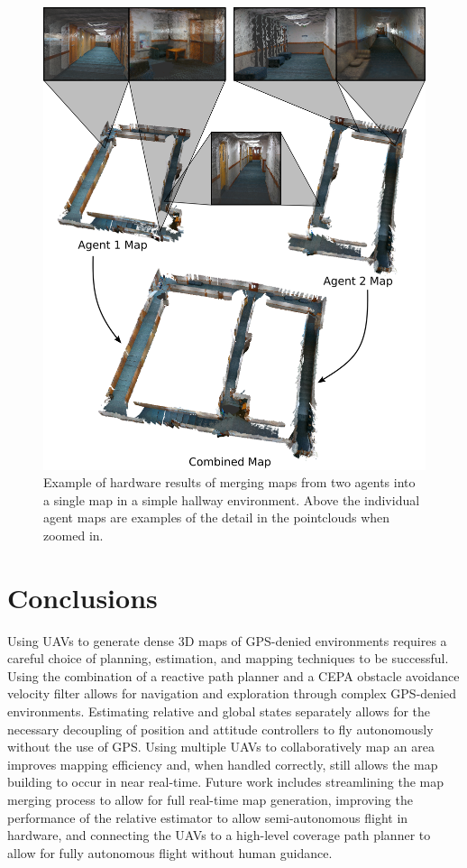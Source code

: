 \documentclass[letterpaper, 10 pt, conference]{ieeeconf}  %
\begin{document}
\begin{figure}
\centering
\includegraphics[width=0.9\linewidth]{wilk3_map.png}
\caption{Example of hardware results of merging maps from two agents into a single map in a simple hallway environment. Above the individual agent maps are examples of the detail in the pointclouds when zoomed in.}
\label{fig:wilk3_map}
\end{figure}
\section{Conclusions}\label{conclusions}

Using UAVs to generate dense 3D maps of GPS-denied environments requires a careful choice of planning, estimation, and mapping techniques to be successful. Using the combination of a reactive path planner and a CEPA obstacle avoidance velocity filter allows for navigation and exploration through complex GPS-denied environments. Estimating relative and global states separately allows for the necessary decoupling of position and attitude controllers to fly autonomously without the use of GPS. Using multiple UAVs to collaboratively map an area improves mapping efficiency and, when handled correctly, still allows the map building to occur in near real-time. Future work includes streamlining the map merging process to allow for full real-time map generation, improving the performance of the relative estimator to allow semi-autonomous flight in hardware, and connecting the UAVs to a high-level coverage path planner to allow for fully autonomous flight without human guidance.



\end{document}
